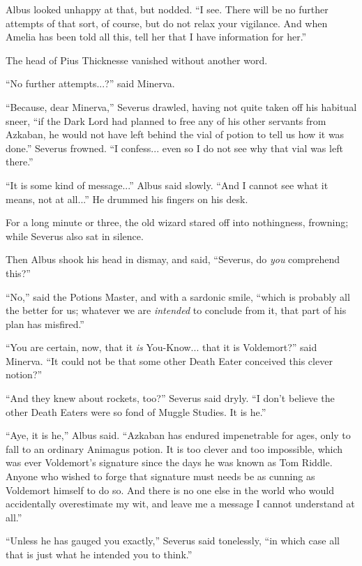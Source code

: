 Albus looked unhappy at that, but nodded. ``I see. There will be no further attempts of that sort, of course, but do not relax your vigilance. And when Amelia has been told all this, tell her that I have information for her.''

The head of Pius Thicknesse vanished without another word.

``No further attempts...?'' said Minerva.

``Because, dear Minerva,'' Severus drawled, having not quite taken off his habitual sneer, ``if the Dark Lord had planned to free any of his other servants from Azkaban, he would not have left behind the vial of potion to tell us how it was done.'' Severus frowned. ``I confess... even so I do not see why that vial was left there.''

``It is some kind of message...'' Albus said slowly. ``And I cannot see what it means, not at all...'' He drummed his fingers on his desk.

For a long minute or three, the old wizard stared off into nothingness, frowning; while Severus also sat in silence.

Then Albus shook his head in dismay, and said, ``Severus, do \emph{you} comprehend this?''

``No,'' said the Potions Master, and with a sardonic smile, ``which is probably all the better for us; whatever we are \emph{intended} to conclude from it, that part of his plan has misfired.''

``You are certain, now, that it \emph{is} You-Know... that it is Voldemort?'' said Minerva. ``It could not be that some other Death Eater conceived this clever notion?''

``And they knew about rockets, too?'' Severus said dryly. ``I don't believe the other Death Eaters were so fond of Muggle Studies. It is he.''

``Aye, it is he,'' Albus said. ``Azkaban has endured impenetrable for ages, only to fall to an ordinary Animagus potion. It is too clever and too impossible, which was ever Voldemort's signature since the days he was known as Tom Riddle. Anyone who wished to forge that signature must needs be as cunning as Voldemort himself to do so. And there is no one else in the world who would accidentally overestimate my wit, and leave me a message I cannot understand at all.''

``Unless he has gauged you exactly,'' Severus said tonelessly, ``in which case all that is just what he intended you to think.''

